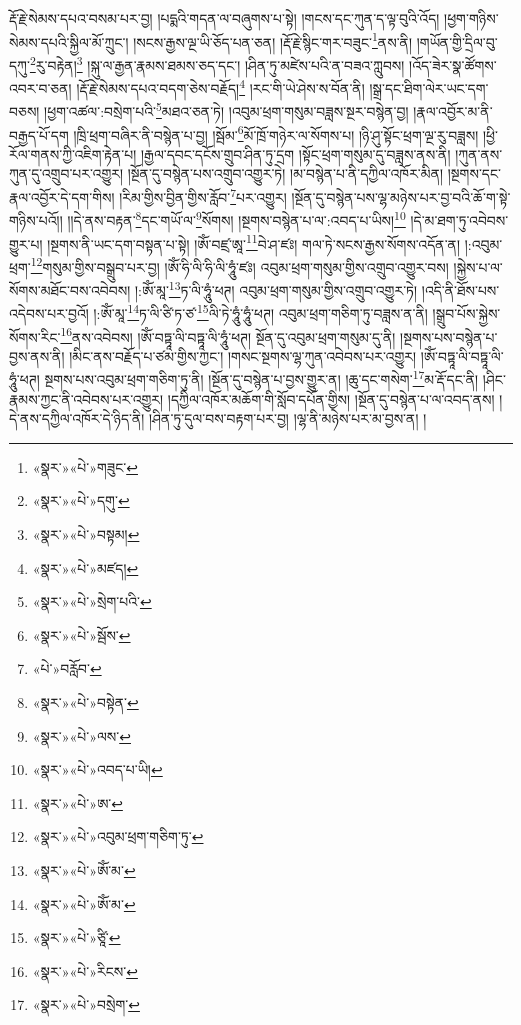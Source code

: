 རྡོ་རྗེ་སེམས་དཔའ་བསམ་པར་བྱ། །པདྨའི་གདན་ལ་བཞུགས་པ་སྟེ། །གངས་དང་ཀུན་ད་ལྟ་བུའི་འོད། །ཕྱག་གཉིས་སེམས་དཔའི་སྐྱིལ་མོ་ཀྲུང་། །སངས་རྒྱས་ལྔ་ཡི་ཅོད་པན་ཅན། །རྡོ་རྗེ་སྙིང་གར་བཟུང་\footnote{«སྣར་»«པེ་»གཟུང་}ནས་ནི། །གཡོན་གྱི་དྲིལ་བུ་དཀུ་\footnote{«སྣར་»«པེ་»དགུ་}རུ་བརྟེན།\footnote{«སྣར་»«པེ་»བསྟམ།} །སྐུ་ལ་རྒྱན་རྣམས་ཐམས་ཅད་དང་། །ཤིན་ཏུ་མཛེས་པའི་ན་བཟའ་ཀླུབས། །འོད་ཟེར་སྣ་ཚོགས་འབར་བ་ཅན། །རྡོ་རྗེ་སེམས་དཔའ་བདག་ཅེས་བརྗོད།\footnote{«སྣར་»«པེ་»མཛད།} །རང་གི་ཡེ་ཤེས་ས་བོན་ནི། །སྒྲ་དང་ཐིག་ལེར་ཡང་དག་བཅས། །ཕྱག་འཚལ་:བསྲེག་པའི་\footnote{«སྣར་»«པེ་»སྲེག་པའི་}མཐའ་ཅན་ཏེ། །འབུམ་ཕྲག་གསུམ་བཟླས་སྔར་བསྙེན་བྱ། །རྣལ་འབྱོར་མ་ནི་བརྒྱད་པོ་དག །ཁྲི་ཕྲག་བཞིར་ནི་བསྙེན་པ་བྱ། །སྦོམ་\footnote{«སྣར་»«པེ་»སྦོས་}མོ་ཁྲོ་གཉེར་ལ་སོགས་པ། །ཉི་ཤུ་སྟོང་ཕྲག་ལྔ་རུ་བཟླས། །ཕྱི་རོལ་གནས་ཀྱི་འཇིག་རྟེན་པ། །རྒྱལ་དབང་དངོས་གྲུབ་ཤིན་ཏུ་དྲག །སྟོང་ཕྲག་གསུམ་དུ་བཟླས་ནས་ནི། །ཀུན་ནས་ཀུན་དུ་འགྲུབ་པར་འགྱུར། །སྔོན་དུ་བསྙེན་པས་འགྲུབ་འགྱུར་ཏེ། །མ་བསྙེན་པ་ནི་དཀྱིལ་འཁོར་མིན། །སྔགས་དང་རྣལ་འབྱོར་དེ་དག་གིས། །རིམ་གྱིས་བྱིན་གྱིས་རློབ་\footnote{«པེ་»བརློབ་}པར་འགྱུར། །སྔོན་དུ་བསྙེན་པས་ལྷ་མཉེས་པར་བྱ་བའི་ཆོ་ག་སྟེ་གཉིས་པའོ།། །།དེ་ནས་བརྟན་\footnote{«སྣར་»«པེ་»བསྟེན་}དང་གཡོ་ལ་\footnote{«སྣར་»«པེ་»ལས་}སོགས། །སྔགས་བསྙེན་པ་ལ་:འབད་པ་ཡིས།\footnote{«སྣར་»«པེ་»འབད་པ་ཡི།} །དེ་མ་ཐག་ཏུ་འབེབས་གྱུར་པ། །སྔགས་ནི་ཡང་དག་བསྟན་པ་སྟེ། །ཨོཾ་བཛྲ་ཨཱ་\footnote{«སྣར་»«པེ་»ཨ་}བེ་ཤ་ཛཿ། གལ་ཏེ་སངས་རྒྱས་སོགས་འདོན་ན། །:འབུམ་ཕྲག་\footnote{«སྣར་»«པེ་»འབུམ་ཕྲག་གཅིག་ཏུ་}གསུམ་གྱིས་བསྒྲུབ་པར་བྱ། །ཨོཾ་ཧི་ལི་ཧི་ལི་ཧཱུཾ་ཛཿ། འབུམ་ཕྲག་གསུམ་གྱིས་འགྲུབ་འགྱུར་བས། །སྐྱེས་པ་ལ་སོགས་མཐོང་བས་འབེབས། །:ཨོཾ་མཱ་\footnote{«སྣར་»«པེ་»ཨོཾ་མ་}ཏ་ལི་ཧཱུཾ་ཕཊ། འབུམ་ཕྲག་གསུམ་གྱིས་འགྲུབ་འགྱུར་ཏེ། །འདི་ནི་ཐོས་པས་འདེབས་པར་བྱའོ། །:ཨོཾ་མཱ་\footnote{«སྣར་»«པེ་»ཨོཾ་མ་}ཏ་ལི་ཙི་ཏ་ཙ་\footnote{«སྣར་»«པེ་»ཙཱི་}ལི་ཏེ་ཧཱུཾ་ཧཱུཾ་ཕཊ། འབུམ་ཕྲག་གཅིག་ཏུ་བཟླས་ན་ནི། །སྒྲུབ་པོས་སྐྱེས་སོགས་རིང་\footnote{«སྣར་»«པེ་»རིངས་}ནས་འབེབས། །ཨོཾ་བཏྟཱ་ལི་བཏྟཱ་ལི་ཧཱུཾ་ཕཊ། སྔོན་དུ་འབུམ་ཕྲག་གསུམ་དུ་ནི། །སྔགས་པས་བསྙེན་པ་བྱས་ནས་ནི། །མིང་ནས་བརྗོད་པ་ཙམ་གྱིས་ཀྱང་། །གསང་སྔགས་ལྷ་ཀུན་འབེབས་པར་འགྱུར། །ཨོཾ་བཏྟཱ་ལི་བཏྟཱ་ལི་ཧཱུཾ་ཕཊ། སྔགས་པས་འབུམ་ཕྲག་གཅིག་ཏུ་ནི། །སྔོན་དུ་བསྙེན་པ་བྱས་གྱུར་ན། །ཆུ་དང་གསེག་\footnote{«སྣར་»«པེ་»བསྲེག་}མ་རྡོ་དང་ནི། །ཤིང་རྣམས་ཀྱང་ནི་འབེབས་པར་འགྱུར། །དཀྱིལ་འཁོར་མཆོག་གི་སློབ་དཔོན་གྱིས། །སྔོན་དུ་བསྙེན་པ་ལ་འབད་ནས། །དེ་ནས་དཀྱིལ་འཁོར་དེ་ཉིད་ནི། །ཤིན་ཏུ་དུལ་བས་བརྟག་པར་བྱ། །ལྷ་ནི་མཉེས་པར་མ་བྱས་ན། །
